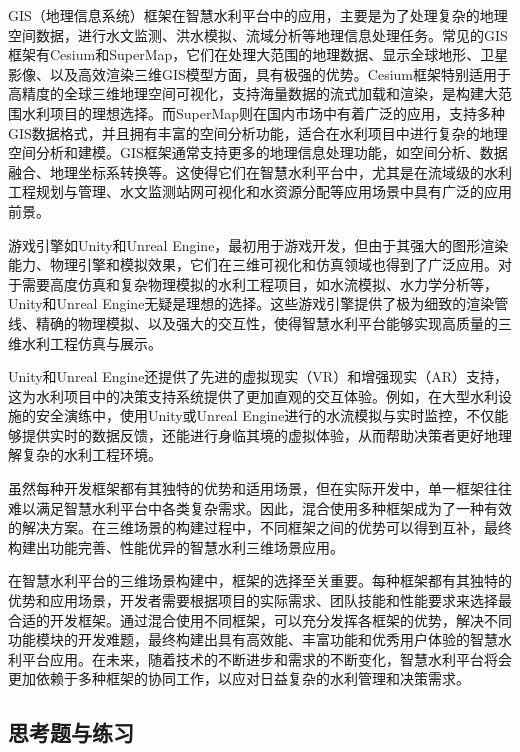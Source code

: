 GIS（地理信息系统）框架在智慧水利平台中的应用，主要是为了处理复杂的地理空间数据，进行水文监测、洪水模拟、流域分析等地理信息处理任务。常见的GIS框架有Cesium和SuperMap，它们在处理大范围的地理数据、显示全球地形、卫星影像、以及高效渲染三维GIS模型方面，具有极强的优势。Cesium框架特别适用于高精度的全球三维地理空间可视化，支持海量数据的流式加载和渲染，是构建大范围水利项目的理想选择。而SuperMap则在国内市场中有着广泛的应用，支持多种GIS数据格式，并且拥有丰富的空间分析功能，适合在水利项目中进行复杂的地理空间分析和建模。GIS框架通常支持更多的地理信息处理功能，如空间分析、数据融合、地理坐标系转换等。这使得它们在智慧水利平台中，尤其是在流域级的水利工程规划与管理、水文监测站网可视化和水资源分配等应用场景中具有广泛的应用前景。

游戏引擎如Unity和Unreal Engine，最初用于游戏开发，但由于其强大的图形渲染能力、物理引擎和模拟效果，它们在三维可视化和仿真领域也得到了广泛应用。对于需要高度仿真和复杂物理模拟的水利工程项目，如水流模拟、水力学分析等，Unity和Unreal Engine无疑是理想的选择。这些游戏引擎提供了极为细致的渲染管线、精确的物理模拟、以及强大的交互性，使得智慧水利平台能够实现高质量的三维水利工程仿真与展示。

Unity和Unreal Engine还提供了先进的虚拟现实（VR）和增强现实（AR）支持，这为水利项目中的决策支持系统提供了更加直观的交互体验。例如，在大型水利设施的安全演练中，使用Unity或Unreal Engine进行的水流模拟与实时监控，不仅能够提供实时的数据反馈，还能进行身临其境的虚拟体验，从而帮助决策者更好地理解复杂的水利工程环境。

虽然每种开发框架都有其独特的优势和适用场景，但在实际开发中，单一框架往往难以满足智慧水利平台中各类复杂需求。因此，混合使用多种框架成为了一种有效的解决方案。在三维场景的构建过程中，不同框架之间的优势可以得到互补，最终构建出功能完善、性能优异的智慧水利三维场景应用。

在智慧水利平台的三维场景构建中，框架的选择至关重要。每种框架都有其独特的优势和应用场景，开发者需要根据项目的实际需求、团队技能和性能要求来选择最合适的开发框架。通过混合使用不同框架，可以充分发挥各框架的优势，解决不同功能模块的开发难题，最终构建出具有高效能、丰富功能和优秀用户体验的智慧水利平台应用。在未来，随着技术的不断进步和需求的不断变化，智慧水利平台将会更加依赖于多种框架的协同工作，以应对日益复杂的水利管理和决策需求。

\hypertarget{ux601dux8003ux9898ux4e0eux7ec3ux4e60-3}{%
\subsection{思考题与练习}\label{ux601dux8003ux9898ux4e0eux7ec3ux4e60-3}}

